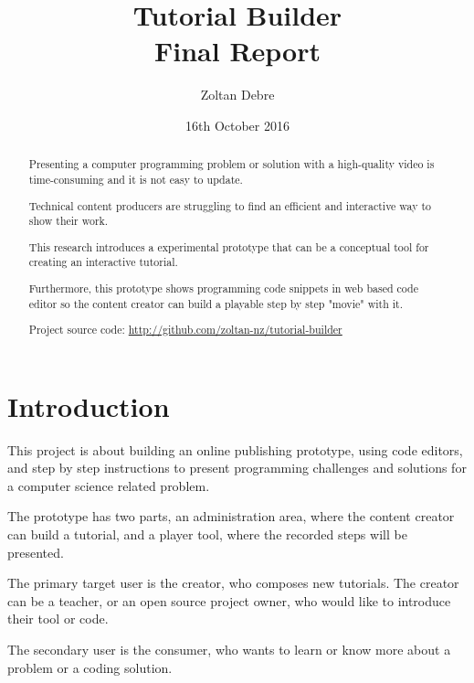 \documentclass[11pt, a4paper, oneside, openright, medskipamount]{report}
\title{%
Tutorial Builder \\
\large Final Report}
\author{Zoltan Debre}
\date{16th October 2016}
\begin{document}
\frontmatter

\begin{abstract}

Presenting a computer programming problem or solution with a high-quality video is time-consuming and it is not easy to update.

Technical content producers are struggling to find an efficient and interactive way to show their work.

This research introduces a experimental prototype that can be a conceptual tool for creating an interactive tutorial.

Furthermore, this prototype shows programming code snippets in web based code editor so the content creator can build a playable step by step "movie" with it.

Project source code: \url{http://github.com/zoltan-nz/tutorial-builder}

\end{abstract}



\maketitle

\tableofcontents


\mainmatter


\chapter{Introduction}

This project is about building an online publishing prototype, using code editors, and step by step instructions to present programming challenges and solutions for a computer science related problem.

The prototype has two parts, an administration area, where the content creator can build a tutorial, and a player tool, where the recorded steps will be presented.

The primary target user is the creator, who composes new tutorials. The creator can be a teacher, or an open source project owner, who would like to introduce their tool or code.

The secondary user is the consumer, who wants to learn or know more about a problem or a coding solution.
\end{document}
